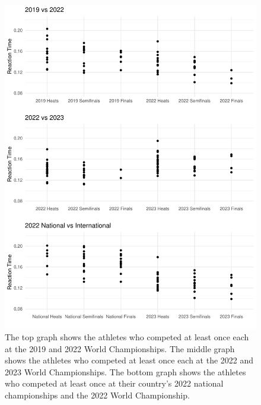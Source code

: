\documentclass[12pt, letterpaper, titlepage]{article}
\begin{document}
\begin{figure}[tbp]
  \centering
  \includegraphics{RankScatterPlots}
  \caption{The top graph shows the athletes who competed at least once each at
  the 2019 and 2022 World Championships.  The middle graph shows the athletes
  who competed at least once each at the 2022 and 2023 World Championships. The
  bottom graph shows the athletes who competed at least once at their country's
  2022 national championships and the 2022 World Championship.}
  \label{fig:RankScatterplots}
\end{figure}
\end{document}
